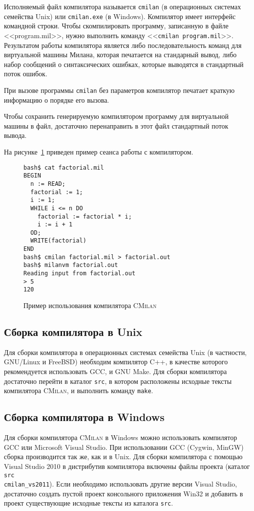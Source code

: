 \documentclass[a4paper,12pt]{article}
\begin{document}
Исполняемый файл компилятора называется \texttt{cmilan} (в операционных системах
семейства Unix) или \texttt{cmilan.exe} (в Windows). Компилятор имеет интерфейс
командной строки. Чтобы скомпилировать программу, записанную в файле
<<program.mil>>, нужно выполнить команду <<\texttt{cmilan program.mil}>>.
Результатом работы компилятора является либо последовательность команд для
виртуальной машины Милана, которая печатается на стандарный вывод, либо набор
сообщений о синтаксических ошибках, которые выводятся в стандартный поток
ошибок.

При вызове программы \texttt{cmilan} без параметров компилятор печатает краткую
информацию о порядке его вызова.

Чтобы сохранить генерируемую компилятором программу для виртуальной машины в
файл, достаточно перенаправить в этот файл стандартный поток вывода.

На рисунке~\ref{cmilan-usage} приведен пример сеанса работы с компилятором.

\begin{figure}
\begin{verbatim}
bash$ cat factorial.mil
BEGIN
  n := READ;
  factorial := 1;
  i := 1;
  WHILE i <= n DO
    factorial := factorial * i;
    i := i + 1
  OD;
  WRITE(factorial)
END
bash$ cmilan factorial.mil > factorial.out
bash$ milanvm factorial.out
Reading input from factorial.out
> 5
120
\end{verbatim}
\label{cmilan-usage}
\caption{Пример использования компилятора \textsc{CMilan}}
\end{figure}

\subsection{Сборка компилятора в Unix}

Для сборки компилятора в операционных системах семейства Unix (в частности,
GNU/Linux и FreeBSD) необходим компилятор C++, в качестве которого рекомендуется
использовать GCC, и GNU Make. Для сборки компилятора достаточно перейти в
каталог \texttt{src}, в котором расположены исходные тексты компилятора
\textsc{CMilan}, и выполнить команду \texttt{make}.

\subsection{Сборка компилятора в Windows}

Для сборки компилятора \textsc{CMilan} в Windows можно использовать компилятор
GCC или Microsoft Visual Studio. При использовании GCC (Cygwin, MinGW) сборка
производится так же, как и в Unix. Для сборки компилятора с помощью Visual
Studio 2010 в дистрибутив компилятора включены файлы проекта (каталог
\texttt{src\\cmilan\_vs2011}). Если необходимо использовать другие версии Visual
Studio, достаточно создать пустой проект консольного приложения Win32 и добавить
в проект существующие исходные тексты из каталога \texttt{src}.
\end{document}
